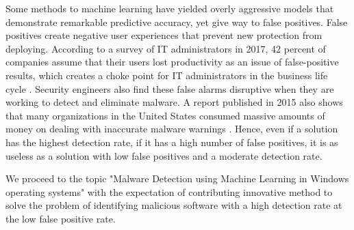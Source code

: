 Some methods to machine learning have yielded overly aggressive models that demonstrate remarkable predictive accuracy, yet give way to false positives. 
False positives create negative user experiences that prevent new protection from deploying. 
According to a survey of IT administrators in 2017, 42 percent of companies assume that their users lost productivity as an issue of false-positive results, which creates a choke point for IT administrators in the business life cycle \cite{jonathan2017survey}. 
Security engineers also find these false alarms disruptive when they are working to detect and eliminate malware. 
A report published in 2015 also shows that many organizations in the United States consumed massive amounts of money on dealing with inaccurate malware warnings \cite{eduard2015false}. 
Hence, even if a solution has the highest detection rate, if it has a high number of false positives, it is as useless as a solution with low false positives and a moderate detection rate.

We proceed to the topic "Malware Detection using Machine Learning in Windows operating systems" with the expectation of contributing innovative method to solve the problem of identifying malicious software with a high detection rate at the low false positive rate.